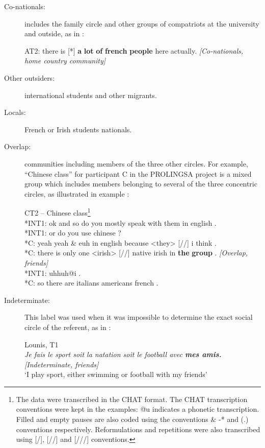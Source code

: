 \documentclass[output=paper]{langscibook}
\begin{document}
\begin{description}
\item[Co-nationals:] includes the family circle and other groups of compatriots at the university and outside, as in :

\ea%
    \label{ex:2}
	AT2: there is [*] \textbf{a} \textbf{lot} \textbf{of} \textbf{french} \textbf{people} here actually. \textit{[Co-nationals, home country community]}
\z

\item[Other outsiders:] international students and other migrants.
\item[Locals:] French or Irish students nationals.
\item[Overlap:] communities including members of the three other circles. For example, “Chinese class” for participant C in the PROLINGSA project is a mixed group which includes members belonging to several of the three concentric circles, as illustrated in example :

\TabPositions{1.5cm,4cm,6cm,8cm}
\ea%
\label{ex:3}
CT2 – Chinese class\footnote{The data were transcribed in the CHAT format. The CHAT transcription conventions were kept in the examples: @u indicates a phonetic transcription. Filled and empty pauses are also coded using the conventions \& -* and (.) conventions respectively. Reformulations and repetitions were also transcribed using [/], [//] and [///] conventions.}\medskip\\
*INT1: \tab  ok and so do you mostly speak with them in english .\\
*INT1: \tab or do you use chinese ?\\
*C:    \tab yeah yeah \& euh in english because <they> [//] i think .\\
*C:    \tab there is only one <irish> [//] native irish in \textbf{the} \textbf{group} . \tab \tab  \textit{[Overlap, friends]}\\
*INT1:  \tab uhhuh@i .\\
*C:  \tab so there are italians americans french .
\z

\item[Indeterminate:] This label was used when it was impossible to determine the exact social circle of the referent, as in :

\ea%
    \label{ex:4}
	Lounis, T1\medskip\\
\textit{Je fais le sport soit la natation soit le football avec \textbf{mes amis.} [Indeterminate, friends]}\\
`I play sport, either swimming or football with my friends'
\z
\end{description}
\end{document}
